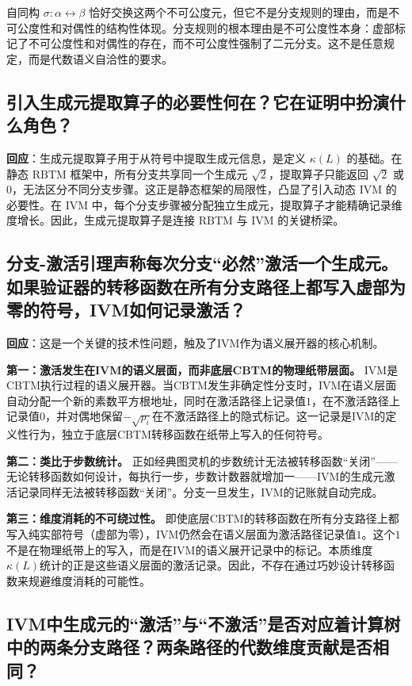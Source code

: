 \documentclass{ctexart}
\begin{document}
	自同构 $\sigma: \alpha \leftrightarrow \beta$ 恰好交换这两个不可公度元，但它不是分支规则的理由，而是不可公度性和对偶性的结构性体现。分支规则的根本理由是不可公度性本身：虚部标记了不可公度性和对偶性的存在，而不可公度性强制了二元分支。这不是任意规定，而是代数语义自洽性的要求。
	
	
	\subsection{引入生成元提取算子的必要性何在？它在证明中扮演什么角色？}
	
	\textbf{回应}：生成元提取算子用于从符号中提取生成元信息，是定义 $\kappa(L)$ 的基础。在静态 $\text{RBTM}$ 框架中，所有分支共享同一个生成元 $\sqrt{2}$，提取算子只能返回 $\sqrt{2}$ 或 $0$，无法区分不同分支步骤。这正是静态框架的局限性，凸显了引入动态 $\mathrm{IVM}$ 的必要性。在 $\mathrm{IVM}$ 中，每个分支步骤被分配独立生成元，提取算子才能精确记录维度增长。因此，生成元提取算子是连接 $\text{RBTM}$ 与 $\mathrm{IVM}$ 的关键桥梁。
	
	
	\subsection{分支-激活引理声称每次分支``必然''激活一个生成元。如果验证器的转移函数在所有分支路径上都写入虚部为零的符号，IVM如何记录激活？}
	
	\textbf{回应}：这是一个关键的技术性问题，触及了IVM作为语义展开器的核心机制。
	
	\textbf{第一：激活发生在IVM的语义层面，而非底层CBTM的物理纸带层面。} IVM是CBTM执行过程的语义展开器。当CBTM发生非确定性分支时，IVM在语义层面自动分配一个新的素数平方根地址，同时在激活路径上记录值$1$，在不激活路径上记录值$0$，并对偶地保留$-\sqrt{p_i}$在不激活路径上的隐式标记。这一记录是IVM的定义性行为，独立于底层CBTM转移函数在纸带上写入的任何符号。
	
	\textbf{第二：类比于步数统计。} 正如经典图灵机的步数统计无法被转移函数``关闭''——无论转移函数如何设计，每执行一步，步数计数器就增加一——IVM的生成元激活记录同样无法被转移函数``关闭''。分支一旦发生，IVM的记账就自动完成。
	
	\textbf{第三：维度消耗的不可绕过性。} 即使底层CBTM的转移函数在所有分支路径上都写入纯实部符号（虚部为零），IVM仍然会在语义层面为激活路径记录值$1$。这个$1$不是在物理纸带上的写入，而是在IVM的语义展开记录中的标记。本质维度$\kappa(L)$统计的正是这些语义层面的激活记录。因此，不存在通过巧妙设计转移函数来规避维度消耗的可能性。
	
	
	\subsection{IVM中生成元的``激活''与``不激活''是否对应着计算树中的两条分支路径？两条路径的代数维度贡献是否相同？}
	
\end{document}
